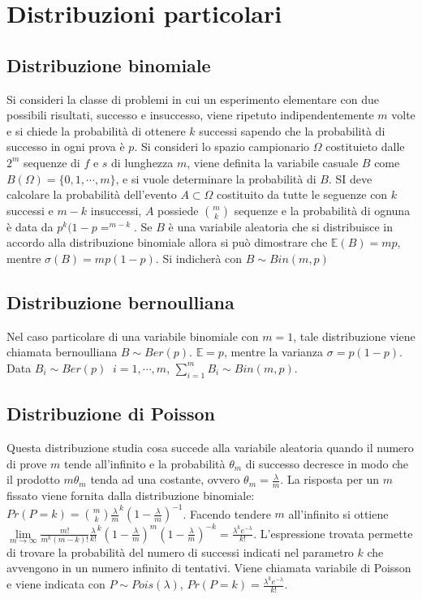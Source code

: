 \section{Distribuzioni particolari}
\subsection{Distribuzione binomiale}
Si consideri la classe di problemi in cui un esperimento elementare con due possibili risultati, successo e insuccesso, viene ripetuto indipendentemente $m$ volte e si chiede la probabilit\`a di ottenere $k$ 
successi sapendo che la probabilit\`a di successo in ogni prova \`e $p$.  Si consideri lo spazio campionario $\Omega$ costituieto dalle $2^m$ sequenze di $f$ e $s$ di lunghezza $m$, viene definita la
variabile casuale $B$ come $B(\Omega)=\{0,1,\cdots, m\}$, e si vuole determinare la probabilit\`a di $B$. SI deve calcolare la probabilit\`a dell'evento $A\subset \Omega$ costituito da tutte le seguenze con
$k$ successi e $m-k$ insuccessi, $A$ possiede $\binom{m}{k}$ sequenze e la probabilit\`a di ognuna \`e data da $p^k(1-p=^{m-k}$. Se $B$ \`e una variabile aleatoria che si distribuisce in accordo alla 
distribuzione binomiale allora si pu\`o dimostrare che $\mathbb{E}(B)=mp$, mentre $\sigma(B)=mp(1-p)$. Si indicher\`a con $B\sim Bin(m,p)$
\subsection{Distribuzione bernoulliana}
Nel caso particolare di una variabile binomiale con $m=1$, tale distribuzione viene chiamata bernoulliana $B\sim Ber(p)$. $\mathbb{E}=p$, mentre la varianza $\sigma=p(1-p)$. Data $B_i\sim Ber(p)\;\; i=1,
\cdots, m$, $\sum\limits_{i=1}^mB_i\sim Bin(m,p)$.
\subsection{Distribuzione di Poisson}
Questa distribuzione studia cosa succede alla variabile aleatoria quando il numero di prove $m$ tende all'infinito e la probabilit\`a $\theta_m$ di successo decresce in modo che il prodotto $m\theta_m$ 
tenda ad una costante, ovvero $\theta_m=\frac{\lambda}{m}$. La risposta per un $m$ fissato viene fornita dalla distribuzione binomiale: $Pr(P=k)=\binom{m}{k}\frac{\lambda}{m}^k(1-\frac{\lambda}
{m})^{-1}$. Facendo tendere $m$ all'infinito si ottiene $\lim\limits_{m\rightarrow\infty}\frac{m!}{m^k(m-k)!}\frac{\lambda}{k!}^k(1-\frac{\lambda}{m})^m(1-\frac{\lambda}{m})^{-k}=\frac{\lambda^ke^{-
\lambda}}{k!}$. L'espressione trovata permette di trovare la probabilit\`a del numero di successi indicati nel parametro $k$ che avvengono in un numero infinito di tentativi. Viene chiamata variabile di Poisson
e viene indicata con $P\sim Pois(\lambda)$, $Pr(P=k)=\frac{\lambda^ke^{-\lambda}}{k!}$.
